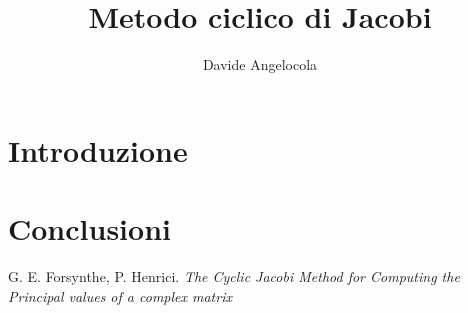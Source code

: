 \documentclass{article}
\title{Metodo ciclico di Jacobi}
\author{Davide Angelocola}
\begin{document}
\maketitle

\section{Introduzione}


\section{Conclusioni}

\begin{thebibliography}{99}
 G. E. Forsynthe, P. Henrici. \textit{The Cyclic
    Jacobi Method for Computing the Principal values of a complex
    matrix}
\end{thebibliography}
\end{document}
